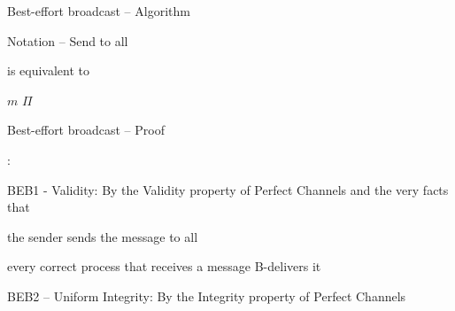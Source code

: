 \begin{frame}{Best-effort broadcast -- Algorithm}

\begin{Procedure}
\caption{Best-effort broadcast protocol executed by $p$}

\BlankLine
{}

\end{Procedure}

\begin{block}{Notation -- Send to all}
	
\begin{minipage}{4cm}
\begin{Procedure}
\end{Procedure}
\end{minipage}
\quad is equivalent to \quad
\begin{minipage}{4cm}
\begin{Procedure}
\SEND $m$ \TO $\Pi$\;
\end{Procedure}
\end{minipage}

\end{block}


\end{frame}

\begin{frame}{Best-effort broadcast -- Proof}

:

\BIL
\item \alert{BEB1 - Validity}: By the Validity property of Perfect Channels and the very facts that 
\BE
\item the sender sends the message to all 
\item every correct process that receives a message B-delivers it
\EE
\item \alert{BEB2 -- Uniform Integrity}: By the Integrity property of Perfect Channels
\EIL

\bigskip
{}

\end{frame}

